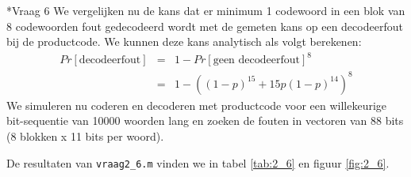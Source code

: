 \documentclass[]{article}
\begin{document}
\begin{section}
\begin{subsection}
    \end{subsection}

    \begin{subsection}*{Vraag 6} %
        We vergelijken nu de kans dat er minimum 1 codewoord in een
        blok van 8 codewoorden fout gedecodeerd wordt met de gemeten
        kans op een decodeerfout bij de productcode. We kunnen deze
        kans analytisch als volgt berekenen:
        \begin{eqnarray*}
            Pr[\text{decodeerfout}]
                &=& 1 - Pr[\text{geen decodeerfout}]^8 \\ 
                &=& 1 - ((1-p)^{15} + 15p(1-p)^{14})^8
        \end{eqnarray*}
	\newpage
        We simuleren nu coderen en decoderen met productcode voor een
        willekeurige bit-sequentie van 10000 woorden lang en zoeken de
        fouten in vectoren van 88 bits (8 blokken x 11 bits per woord).
        
        De resultaten van \texttt{vraag2\_6.m} vinden we in tabel
        \ref{tab:2_6} en figuur \ref{fig:2_6}.


\end{subsection}
\end{section}
\end{document}

